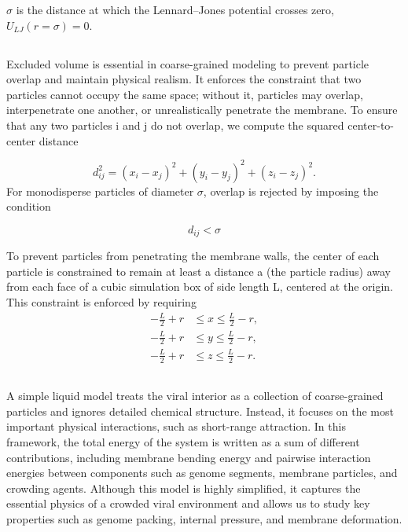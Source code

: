 \documentclass[12pt]{article}
\begin{document}
\begin{flushleft}
$\sigma$ is the distance at which the Lennard--Jones potential crosses zero, $U_{LJ}(r=\sigma)=0$.



  \subsection*{}
Excluded volume is essential in coarse-grained modeling to prevent particle overlap and maintain physical realism. It enforces the constraint that two particles cannot occupy the same space; without it, particles may overlap, interpenetrate one another, or unrealistically penetrate the membrane. To ensure that any two particles 
i and j do not overlap, we compute the squared center-to-center distance

\begin{equation}
d_{ij}^2 = (x_i - x_j)^2 + (y_i - y_j)^2 + (z_i - z_j)^2.
\end{equation}
For monodisperse particles of diameter $\sigma$, overlap is rejected by imposing the condition

\begin{equation}
d_{ij}< \sigma
\end{equation}

 

 
To prevent particles from penetrating the membrane walls, the center of each particle is constrained to remain at least a distance 
a (the particle radius) away from each face of a cubic simulation box of side length L, centered at the origin. This constraint is enforced by requiring
\begin{equation}
\begin{aligned}
-\frac{L}{2}+r &\le x \le \frac{L}{2}-r,\\
-\frac{L}{2}+r &\le y \le \frac{L}{2}-r,\\
-\frac{L}{2}+r &\le z \le \frac{L}{2}-r.
\end{aligned}
\end{equation}






\subsection*{}


A simple liquid model treats the viral interior as a collection of coarse-grained particles and ignores detailed chemical structure. Instead, it focuses on the most important physical interactions, such as short-range attraction. In this framework, the total energy of the system is written as a sum of different contributions, including membrane bending energy and pairwise interaction energies between components such as genome segments, membrane particles, and crowding agents. Although this model is highly simplified, it captures the essential physics of a crowded viral environment and allows us to study key properties such as genome packing, internal pressure, and membrane deformation.


\end{flushleft}
\end{document}
